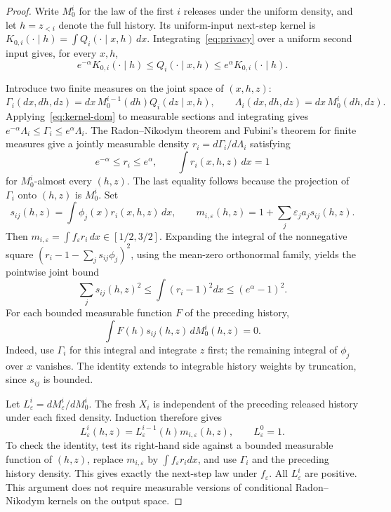 \documentclass[11pt]{article}
\begin{document}
\begin{proof}
Write $M_0^i$ for the law of the first $i$ releases under the uniform density,
and let $h=z_{<i}$ denote the full history. Its uniform-input next-step kernel
is $K_{0,i}(\cdot\mid h)=\int Q_i(\cdot\mid x,h)\,dx$.
Integrating~\eqref{eq:privacy} over a uniform second input gives, for every
$x,h$,
\begin{equation}\label{eq:kernel-dom}
 e^{-\alpha}K_{0,i}(\cdot\mid h)\le Q_i(\cdot\mid x,h)
 \le e^\alpha K_{0,i}(\cdot\mid h).
\end{equation}

Introduce two finite measures on the joint space of $(x,h,z)$:
\[
 \Gamma_i(dx,dh,dz)=dx\,M_0^{i-1}(dh)Q_i(dz\mid x,h),\qquad
 \Lambda_i(dx,dh,dz)=dx\,M_0^i(dh,dz).
\]
Applying~\eqref{eq:kernel-dom} to measurable sections and integrating gives
$e^{-\alpha}\Lambda_i\le\Gamma_i\le e^\alpha\Lambda_i$.
The Radon--Nikodym theorem and Fubini's theorem for finite measures
\cite[232F, 252C, 252H]{Fremlin} give a jointly measurable density
$r_i=d\Gamma_i/d\Lambda_i$ satisfying
\[
 e^{-\alpha}\le r_i\le e^\alpha,\qquad
 \int r_i(x,h,z)\,dx=1
\]
for $M_0^i$-almost every $(h,z)$. The last equality follows because the
projection of $\Gamma_i$ onto $(h,z)$ is $M_0^i$.
Set
\[
 s_{ij}(h,z)=\int\phi_j(x)r_i(x,h,z)\,dx,\qquad
 m_{i,\varepsilon}(h,z)=1+\sum_j\varepsilon_j a_j s_{ij}(h,z).
\]
Then $m_{i,\varepsilon}=\int f_\varepsilon r_i\,dx\in[1/2,3/2]$.
Expanding the integral of the nonnegative square
$(r_i-1-\sum_j s_{ij}\phi_j)^2$, using the mean-zero orthonormal family,
yields the pointwise joint bound
\begin{equation}\label{eq:orth-trace}
 \sum_j s_{ij}(h,z)^2\le\int(r_i-1)^2dx\le(e^\alpha-1)^2.
\end{equation}
For each bounded measurable function $F$ of the preceding history,
\begin{equation}\label{eq:score-zero}
 \int F(h)s_{ij}(h,z)\,dM_0^i(h,z)=0.
\end{equation}
Indeed, use $\Gamma_i$ for this integral and integrate $z$ first; the
remaining integral of $\phi_j$ over $x$ vanishes. The identity extends to
integrable history weights by truncation, since $s_{ij}$ is bounded.

Let $L_\varepsilon^i=dM_\varepsilon^i/dM_0^i$.
The fresh $X_i$ is independent of the preceding released history under each
fixed density. Induction therefore gives
\begin{equation}\label{eq:sequential-density}
 L_\varepsilon^i(h,z)
 =L_\varepsilon^{i-1}(h)m_{i,\varepsilon}(h,z),\qquad
 L_\varepsilon^0=1.
\end{equation}
To check the identity, test its right-hand side against a bounded measurable
function of $(h,z)$, replace $m_{i,\varepsilon}$ by
$\int f_\varepsilon r_i dx$, and use $\Gamma_i$ and the preceding
history density. This gives exactly the next-step law under $f_\varepsilon$.
All $L_\varepsilon^i$ are positive. This argument does not require measurable
versions of conditional Radon--Nikodym kernels on the output space.


\end{proof}
\end{document}
